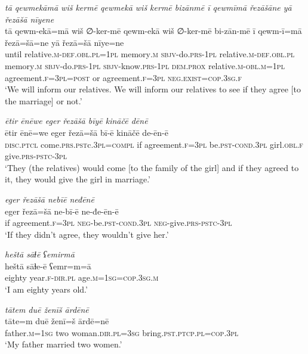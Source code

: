 \ea \label{ŽE.83}
\textit{tā qewmekāmā wiš kermē qewmekā wiš kermē bizānmē ī qewmīmā řezāšāne yā řezāšā nīyene} \\ 
\gll tā qewm-ekā=mā wiš ∅-ker-mē qewm-ekā wiš ∅-ker-mē bi-zān-mē ī qewm-ī=mā řezā=šā=ne yā řezā=šā nīye=ne \\ 
 until relative\textsc{.m}\textsc{-def}\textsc{.obl}\textsc{.pl}\textsc{=1pl} memory\textsc{.m} \textsc{sbjv-}do\textsc{.prs}\textsc{-1pl} relative\textsc{.m}\textsc{-def}\textsc{.obl}\textsc{.pl} memory\textsc{.m} \textsc{sbjv-}do\textsc{.prs}\textsc{-1pl} \textsc{sbjv-}know\textsc{.prs}\textsc{-1pl} \textsc{dem.prox} relative\textsc{.m}\textsc{-obl}\textsc{.m}\textsc{=1pl} agreement\textsc{.f}\textsc{=3pl}\textsc{=\textsc{post}} or agreement\textsc{.f}\textsc{=3pl} \textsc{\textsc{neg.}exist}\textsc{=cop}\textsc{.3sg}\textsc{.f} \\ 
\glt `We will inform our relatives. We will inform our relatives to see if they agree [to the  marriage] or not.'
\z 
 
\ea \label{ŽE.84}
\textit{ētir ēnēwe eger řezāšā bīyē kināčē dēnē} \\ 
\gll ētir ēnē=we eger řezā=šā bī-ē kināčē de-ēn-ē \\ 
 \textsc{disc}.\textsc{ptcl} come\textsc{.prs}\textsc{.pst}c\textsc{.3pl}\textsc{=compl} if agreement\textsc{.f}\textsc{=3pl} be\textsc{.pst}\textsc{-cond}\textsc{.3pl} girl\textsc{.obl}\textsc{.f} give\textsc{.prs}\textsc{-pstc-3pl} \\ 
\glt `They (the relatives) would come [to the family of the girl] and if they agreed to it, they would give the girl in marriage.'
\z 
 
\ea \label{ŽE.85}
\textit{eger řezāšā nebīē neđēnē} \\ 
\gll eger řezā=šā ne-bī-ē ne-đe-ēn-ē \\ 
 if agreement\textsc{.f}\textsc{=3pl} \textsc{neg-}be\textsc{.pst}\textsc{-cond}\textsc{.3pl} \textsc{neg-}give\textsc{.prs}\textsc{-pstc-3pl} \\ 
\glt `If they didn’t agree, they wouldn’t give her.'
\z 
 

\ea \label{ŽM.1}
\textit{heštā sāɫē ʕemirmā} \\ 
\gll heštā sāɫe-ē ʕemr=m=ā \\ 
 eighty year\textsc{.f}\textsc{-dir}\textsc{.pl} age\textsc{.m}\textsc{=\textsc{1sg}}\textsc{=cop}\textsc{.3sg}\textsc{.m} \\ 
\glt `I am eighty years old.'
\z 
 
\ea \label{ŽM.2}
\textit{tātem duē ženīš ārdēnē} \\ 
\gll tāte=m duē ženī=š ārdē=nē \\ 
 father\textsc{.m}\textsc{=\textsc{1sg}} two woman\textsc{.dir}\textsc{.pl}\textsc{=3sg} bring\textsc{.pst}\textsc{.ptcp}\textsc{.pl}\textsc{=cop}\textsc{.3pl} \\ 
\glt `My father married two women.'
\z 
 
